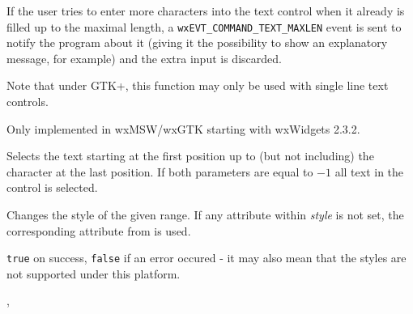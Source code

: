 If the user tries to enter more characters into the text control when it
already is filled up to the maximal length, a
{\tt wxEVT\_COMMAND\_TEXT\_MAXLEN} event is sent to notify the program about it
(giving it the possibility to show an explanatory message, for example) and the
extra input is discarded.

Note that under GTK+, this function may only be used with single line text controls.


Only implemented in wxMSW/wxGTK starting with wxWidgets 2.3.2.


\label{wxtextctrlsetselection}


Selects the text starting at the first position up to (but not including) the
character at the last position. If both parameters are equal to $-1$ all text
in the control is selected.





\label{wxtextctrlsetstyle}


Changes the style of the given range. If any attribute within {\it style} is
not set, the corresponding attribute from  is used.






{\tt true} on success, {\tt false} if an error occured - it may also mean that
the styles are not supported under this platform.


, 


\label{wxtextctrlsetvalue}


